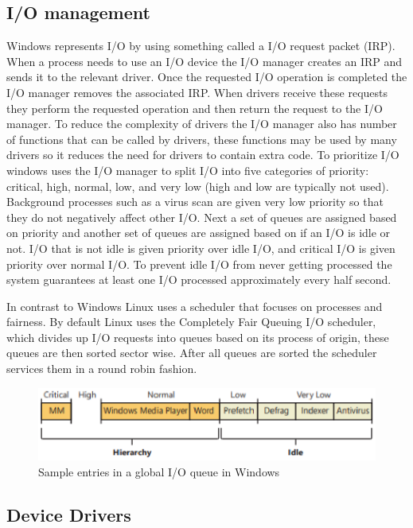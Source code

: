 \documentclass[letterpaper, 10pt, onecolumn, draftclsnofoot]{IEEEtran}
\begin{document}
\subsection{I/O management}
Windows represents I/O by using something called a I/O request packet (IRP). When a process needs to use an I/O device the I/O manager creates an IRP and sends it to the relevant driver. Once the requested I/O operation is completed the I/O manager removes the associated IRP. When drivers receive these requests they perform the requested operation and then return the request to the I/O manager. To reduce the complexity of drivers the I/O manager also has number of functions that can be called by drivers, these functions may be used by many drivers so it reduces the need for drivers to contain extra code.\cite{wi_p2}
To prioritize I/O windows uses the I/O manager to split I/O into five categories of priority: critical, high, normal, low, and very low (high and low are typically not used). Background processes such as a virus scan are given very low priority so that they do not negatively affect other I/O.
Next a set of queues are assigned based on priority and another set of queues are assigned based on if an I/O is idle or not. I/O that is not idle is given priority over idle I/O, and critical I/O is given priority over normal I/O. To prevent idle I/O from never getting processed the system guarantees at least one I/O processed approximately every half second.\cite{wi_p2}

In contrast to Windows Linux uses a scheduler that focuses on processes and fairness. By default Linux uses the Completely Fair Queuing I/O scheduler, which divides up I/O requests into queues based on its process of origin, these queues are then sorted sector wise. After all queues are sorted the scheduler services them in a round robin fashion.\cite{linux}

\begin{figure}[H]
  \caption{Sample entries in a global I/O queue in Windows\cite{wi_p2}}
  \includegraphics[scale=1]{qd.eps}
\end{figure}

\subsection{Device Drivers}
\end{document}
